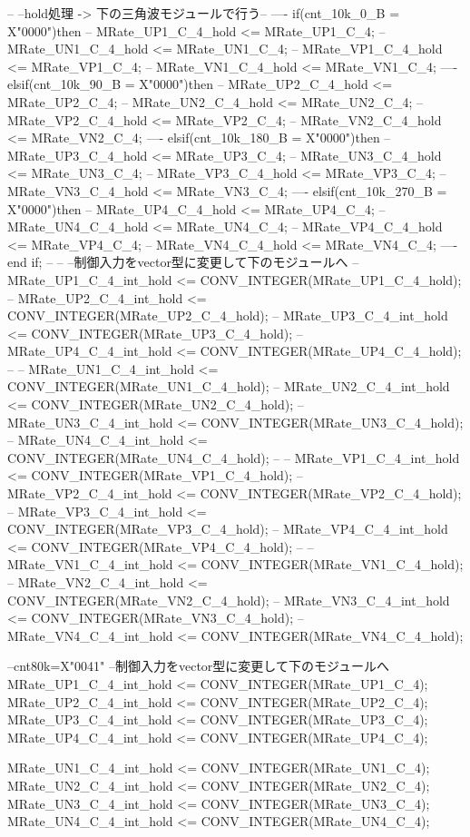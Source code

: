 \begin{mylisting}[language=VHDL,caption=ゲート信号出力モジュール,label=MMC_PWM_GEN_module_VHDL]
		--	--hold処理 -> 下の三角波モジュールで行う--
		----	if(cnt_10k_0_B = X"0000")then
		--		MRate_UP1_C_4_hold <= MRate_UP1_C_4;
		--		MRate_UN1_C_4_hold <= MRate_UN1_C_4;
		--		MRate_VP1_C_4_hold <= MRate_VP1_C_4;
		--		MRate_VN1_C_4_hold <= MRate_VN1_C_4;
		----	elsif(cnt_10k_90_B = X"0000")then
		--		MRate_UP2_C_4_hold <= MRate_UP2_C_4;
		--		MRate_UN2_C_4_hold <= MRate_UN2_C_4;
		--		MRate_VP2_C_4_hold <= MRate_VP2_C_4;
		--		MRate_VN2_C_4_hold <= MRate_VN2_C_4;
		----	elsif(cnt_10k_180_B = X"0000")then		
		--		MRate_UP3_C_4_hold <= MRate_UP3_C_4;
		--		MRate_UN3_C_4_hold <= MRate_UN3_C_4;
		--		MRate_VP3_C_4_hold <= MRate_VP3_C_4;
		--		MRate_VN3_C_4_hold <= MRate_VN3_C_4;
		----	elsif(cnt_10k_270_B = X"0000")then		
		--		MRate_UP4_C_4_hold <= MRate_UP4_C_4;
		--		MRate_UN4_C_4_hold <= MRate_UN4_C_4;
		--		MRate_VP4_C_4_hold <= MRate_VP4_C_4;
		--		MRate_VN4_C_4_hold <= MRate_VN4_C_4;
		----	end if;
		--	
		--	--制御入力をvector型に変更して下のモジュールへ
		--	MRate_UP1_C_4_int_hold <= CONV_INTEGER(MRate_UP1_C_4_hold);
		--	MRate_UP2_C_4_int_hold <= CONV_INTEGER(MRate_UP2_C_4_hold);
		--	MRate_UP3_C_4_int_hold <= CONV_INTEGER(MRate_UP3_C_4_hold);
		--	MRate_UP4_C_4_int_hold <= CONV_INTEGER(MRate_UP4_C_4_hold);
		--
		--	MRate_UN1_C_4_int_hold <= CONV_INTEGER(MRate_UN1_C_4_hold);
		--	MRate_UN2_C_4_int_hold <= CONV_INTEGER(MRate_UN2_C_4_hold);
		--	MRate_UN3_C_4_int_hold <= CONV_INTEGER(MRate_UN3_C_4_hold);
		--	MRate_UN4_C_4_int_hold <= CONV_INTEGER(MRate_UN4_C_4_hold);
		--
		--	MRate_VP1_C_4_int_hold <= CONV_INTEGER(MRate_VP1_C_4_hold);
		--	MRate_VP2_C_4_int_hold <= CONV_INTEGER(MRate_VP2_C_4_hold);
		--	MRate_VP3_C_4_int_hold <= CONV_INTEGER(MRate_VP3_C_4_hold);
		--	MRate_VP4_C_4_int_hold <= CONV_INTEGER(MRate_VP4_C_4_hold);
		--
		--	MRate_VN1_C_4_int_hold <= CONV_INTEGER(MRate_VN1_C_4_hold);
		--	MRate_VN2_C_4_int_hold <= CONV_INTEGER(MRate_VN2_C_4_hold);
		--	MRate_VN3_C_4_int_hold <= CONV_INTEGER(MRate_VN3_C_4_hold);
		--	MRate_VN4_C_4_int_hold <= CONV_INTEGER(MRate_VN4_C_4_hold);
			
		--cnt80k=X"0041"
		--制御入力をvector型に変更して下のモジュールへ
			MRate_UP1_C_4_int_hold <= CONV_INTEGER(MRate_UP1_C_4);
			MRate_UP2_C_4_int_hold <= CONV_INTEGER(MRate_UP2_C_4);
			MRate_UP3_C_4_int_hold <= CONV_INTEGER(MRate_UP3_C_4);
			MRate_UP4_C_4_int_hold <= CONV_INTEGER(MRate_UP4_C_4);

			MRate_UN1_C_4_int_hold <= CONV_INTEGER(MRate_UN1_C_4);
			MRate_UN2_C_4_int_hold <= CONV_INTEGER(MRate_UN2_C_4);
			MRate_UN3_C_4_int_hold <= CONV_INTEGER(MRate_UN3_C_4);
			MRate_UN4_C_4_int_hold <= CONV_INTEGER(MRate_UN4_C_4);


\end{mylisting}
